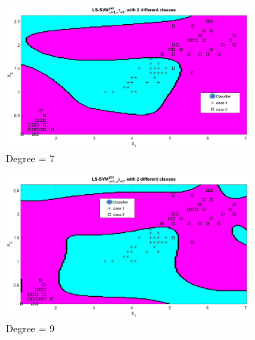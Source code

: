 \documentclass[12pt]{report}
\begin{document}
{\begin{figure}[!htbp]
 	\begin{subfigure}{.33\textwidth}
 		\centering
 		\includegraphics[height=0.8\linewidth,width=1\linewidth]{Ex1.3_deg(7).jpg}
 		\caption{Degree = 7}
 		\label{fig:deg(7)}
 	\end{subfigure}%
 	\begin{subfigure}{.33\textwidth}
 		\centering
 		\includegraphics[height=0.8\linewidth,width=1\linewidth]{Ex1.3_deg(9).jpg}
 		\caption{Degree = 9}
 		\label{fig:deg(9)}
 	\end{subfigure}%
 	\begin{subfigure}{.33\textwidth}
 		\centering

\end{subfigure}
\end{figure}}
\end{document}
